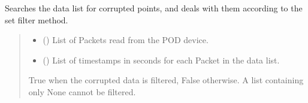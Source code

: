 \documentclass[letterpaper,10pt,english]{sphinxmanual}
\begin{document}
\begin{fulllineitems}
\begin{fulllineitems}
\end{fulllineitems}


\begin{fulllineitems}
\label{\detokenize{PodApi.Stream.Collect:PodApi.Stream.Collect.DataHose.Hose._Filter}}
\pysigstartsignatures
{}
\pysigstopsignatures
\sphinxAtStartPar
Searches the data list for corrupted points, and deals with them         according to the set filter method.
\begin{quote}\begin{description}
\begin{itemize}
\item {} 
\sphinxAtStartPar
{} (\sphinxstyleliteralemphasis{\sphinxupquote{{[}}}{\hyperref[\detokenize{PodApi.Packets:PodApi.Packets.Packet.Packet}]{\sphinxcrossref{\sphinxstyleliteralemphasis{\sphinxupquote{Packet}}}}}\sphinxstyleliteralemphasis{\sphinxupquote{ | }}\sphinxstyleliteralemphasis{\sphinxupquote{{]}}}) \textendash{} List of Packets read from the POD device.

\item {} 
\sphinxAtStartPar
{} (\sphinxstyleliteralemphasis{\sphinxupquote{{[}}}\sphinxstyleliteralemphasis{\sphinxupquote{{]}}}) \textendash{} List of timestamps in seconds for each Packet                 in the data list.

\end{itemize}

\sphinxAtStartPar
True when the corrupted data is filtered, False otherwise. A list                 containing only None cannot be filtered.


\end{description}
\end{quote}
\end{fulllineitems}
\end{fulllineitems}
\end{document}
